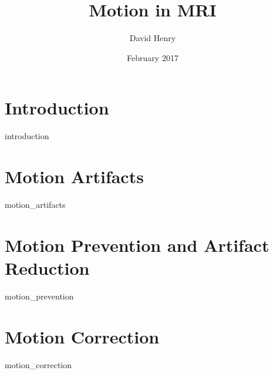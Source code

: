 \documentclass{article}
\title{Motion in MRI}
\author{David Henry}
\date{February 2017}
\begin{document}
\maketitle

\section{Introduction}
{introduction}

\section{Motion Artifacts}
{motion_artifacts}

\section{Motion Prevention and Artifact Reduction}
{motion_prevention}

\section{Motion Correction}
{motion_correction}

\printbibliography
\end{document}
